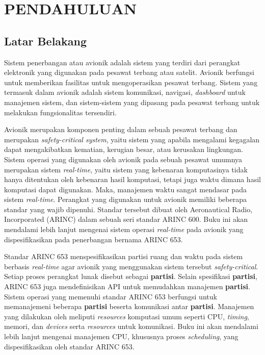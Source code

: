 \chapter{PENDAHULUAN}

\section{Latar Belakang}

Sistem penerbangan atau avionik adalah sistem yang terdiri dari perangkat elektronik yang digunakan pada pesawat terbang
atau satelit. Avionik berfungsi untuk memberikan fasilitas untuk mengoperasikan pesawat terbang. Sistem yang termasuk
dalam avionik adalah sistem komunikasi, navigasi, \textit{dashboard} untuk manajemen sistem, dan sistem-sistem yang
dipasang pada pesawat terbang untuk melakukan fungsionalitas tersendiri.

Avionik merupakan komponen penting dalam sebuah pesawat terbang dan merupakan \textit{safety-critical system}, yaitu
sistem yang apabila mengalami kegagalan dapat mengakibatkan kematian, kerugian besar, atau kerusakan lingkungan. Sistem
operasi yang digunakan oleh avionik pada sebuah pesawat umumnya merupakan sistem \textit{real-time}, yaitu sistem
yang kebenaran komputasinya tidak hanya ditentukan oleh kebenaran hasil komputasi, tetapi juga waktu dimana hasil
komputasi dapat digunakan. %
Maka, manajemen waktu sangat mendasar pada sistem \textit{real-time}. Perangkat yang digunakan untuk avionik memiliki
beberapa standar yang wajib dipenuhi.  Standar tersebut dibuat oleh Aeronautical Radio, Incorporated (ARINC) dalam
sebuah seri standar ARINC 600. Buku ini akan mendalami lebih lanjut mengenai sistem operasi \textit{real-time} pada
avionik yang dispesifikasikan pada penerbangan bernama ARINC 653.

Standar ARINC 653 menspesifikasikan partisi ruang dan waktu pada sistem berbasis \textit{real-time} agar avionik yang
menggunakan sistem tersebut \textit{safety-critical}. Setiap proses perangkat lunak disebut sebagai \textbf{partisi}.
Selain spesifikasi \textbf{partisi}, ARINC 653 juga mendefinisikan API untuk memudahkan manajemen \textbf{partisi}.
Sistem operasi yang memenuhi standar ARINC 653 berfungsi untuk memanajemeni beberapa \textbf{partisi} beserta
komunikasi antar \textbf{partisi}. Manajemen yang dilakukan oleh meliputi \textit{resources} komputasi umum seperti CPU,
\textit{timing}, memori, dan \textit{devices} serta \textit{resources} untuk komunikasi. Buku ini akan mendalami lebih
lanjut mengenai manajemen CPU, khususnya proses \textit{scheduling}, yang dispesifikasikan oleh standar ARINC 653.

